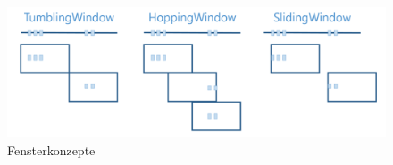 \begin{figure}[h!]
	\centering
	\includegraphics[width=1.0\linewidth]{images/fensterfunktionen}
	\caption{Fensterkonzepte} %
	\label{fig:window_concepts}
\end{figure}
